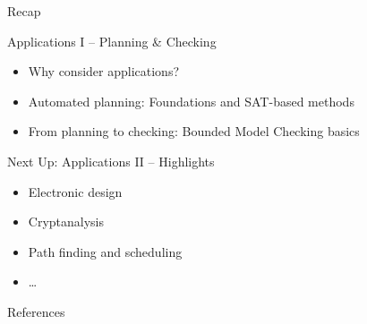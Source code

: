 \documentclass[t,english]{sdqbeamer}
\begin{document}
\begin{frame}{Recap}
	\begin{blueblock}{Applications I -- Planning \& Checking}
		\begin{itemize}\setlength{\itemsep}{1ex}
			\item Why consider applications?
			\item Automated planning: Foundations and SAT-based methods
			\item From planning to checking: Bounded Model Checking basics
		\end{itemize}
	\end{blueblock}
	
	\begin{block}{Next Up: Applications II -- Highlights}
		\begin{itemize}
			\item Electronic design
			\item Cryptanalysis
			\item Path finding and scheduling
			\item \ldots
		\end{itemize}
	\end{block}
\end{frame}


\begin{frame}[allowframebreaks]{References}
	\renewcommand*{\bibfont}{\footnotesize}
	\printbibliography[heading=subbibliography]
\end{frame}
\end{document}
